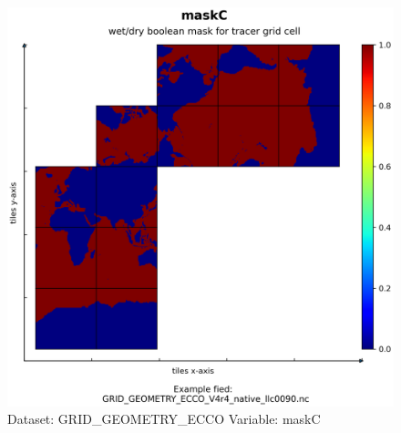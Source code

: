 \begin{figure}[H]
\centering
\includegraphics[scale=0.55]{../images/plots/native_plots_coords/Geometry_Parameters_for_the_Lat-Lon-Cap_90_(llc90)_Native_Model_Grid_(Version_4_Release_4)/maskC.png}
\caption{Dataset: GRID\_GEOMETRY\_ECCO Variable: maskC}
\label{tab:table-GRID_GEOMETRY_ECCO_maskC-Plot}
\end{figure}
\pagebreak
